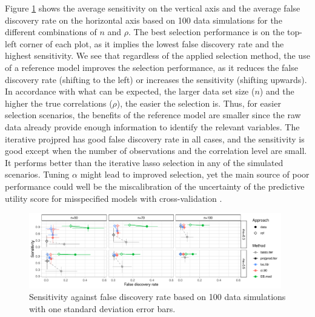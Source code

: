 \documentclass[a4]{article}
\theoremstyle{definition}
\begin{document}
Figure \ref{fig:sensitivity_vs_fdr_iterated} shows the average sensitivity on
the vertical axis and the average false discovery rate on the
horizontal axis based on 100 data simulations for the different
combinations of $n$ and $\rho$. The best selection performance is on the
top-left corner of each plot, as it implies the lowest false discovery
rate and the highest sensitivity. We see that regardless of the
applied selection method, the use of a reference model improves the
selection performance, as it reduces the false discovery rate (shifting
to the left) or increases the sensitivity (shifting upwards). In
accordance with what can be expected, the larger data set size ($n$) and the higher the true correlations ($\rho$), the easier the
selection is. Thus, for easier selection scenarios, the benefits of
the reference model are smaller since the raw data already provide
enough information to identify the relevant variables. The iterative
projpred has good false discovery rate in all cases, and the
sensitivity is good except when the number of observations and the
correlation level are small. It performs better than the iterative lasso 
selection in any of the simulated scenarios. Tuning $\alpha$ might lead to improved
selection, yet the main source of poor performance could well be the
miscalibration of the uncertainty of the predictive utility score for
misspecified models with cross-validation \citep{bengio2004no}.

\begin{figure}[tp]
  \centering
  \includegraphics[width=0.98\textwidth]{graphics/sensitivity_vs_fdr_iterated.pdf}
  \caption{Sensitivity against false discovery rate based on 100 data simulations with one standard deviation error bars.\\}
  \label{fig:sensitivity_vs_fdr_iterated}
\end{figure}

\end{document}

